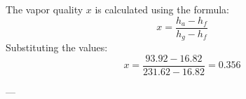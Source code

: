 The vapor quality \( x \) is calculated using the formula:  
\[
x = \frac{h_a - h_f}{h_g - h_f}
\]  
Substituting the values:  
\[
x = \frac{93.92 - 16.82}{231.62 - 16.82} = 0.356
\]  

---